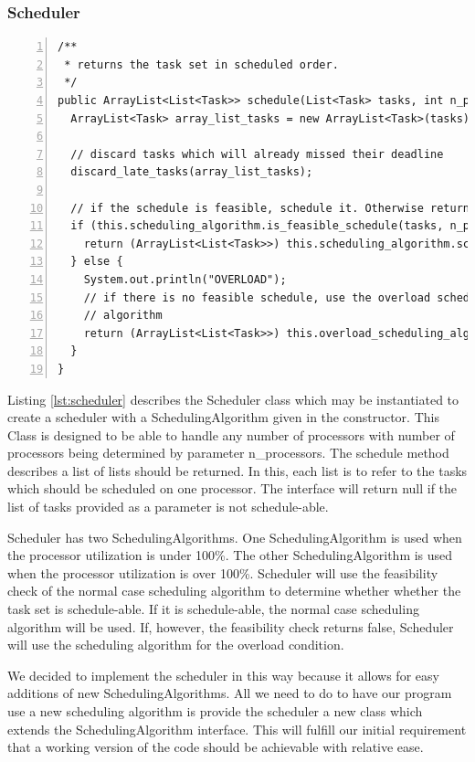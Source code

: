 \documentclass{article} %
\begin{document}
\subsubsection{Scheduler}
\begin{lstlisting}[caption={The scheduler uses a scheduling algorithm to choose the order of tasks},label={lst:scheduler},numbers=left]
/**
 * returns the task set in scheduled order.
 */
public ArrayList<List<Task>> schedule(List<Task> tasks, int n_processors) {
  ArrayList<Task> array_list_tasks = new ArrayList<Task>(tasks);

  // discard tasks which will already missed their deadline
  discard_late_tasks(array_list_tasks);

  // if the schedule is feasible, schedule it. Otherwise return null.
  if (this.scheduling_algorithm.is_feasible_schedule(tasks, n_processors)) {
    return (ArrayList<List<Task>>) this.scheduling_algorithm.schedule(array_list_tasks, n_processors);
  } else {
    System.out.println("OVERLOAD");
    // if there is no feasible schedule, use the overload scheduling
    // algorithm
    return (ArrayList<List<Task>>) this.overload_scheduling_algorithm.schedule(array_list_tasks, n_processors);
  }
}
\end{lstlisting}

Listing \ref{lst:scheduler} describes the Scheduler class which may be instantiated to create a scheduler with a SchedulingAlgorithm given in the constructor.
This Class is designed to be able to handle any number of processors with number of processors being determined by parameter n\_processors.
The schedule method describes a list of lists should be returned.
In this, each list is to refer to the tasks which should be scheduled on one processor.
The interface will return null if the list of tasks provided as a parameter is not schedule-able.

Scheduler has two SchedulingAlgorithms.
One SchedulingAlgorithm is used when the processor utilization is under 100\%.
The other SchedulingAlgorithm is used when the processor utilization is over 100\%. 
Scheduler will use the feasibility check of the normal case scheduling algorithm to determine whether whether the task set is schedule-able.
If it is schedule-able, the normal case scheduling algorithm will be used.
If, however, the feasibility check returns false, Scheduler will use the scheduling algorithm for the overload condition.

We decided to implement the scheduler in this way because it allows for easy additions of new SchedulingAlgorithms.
All we need to do to have our program use a new scheduling algorithm is provide the scheduler a new class which extends the SchedulingAlgorithm interface.
This will fulfill our initial requirement that a working version of the code should be achievable with relative ease.
\end{document}
